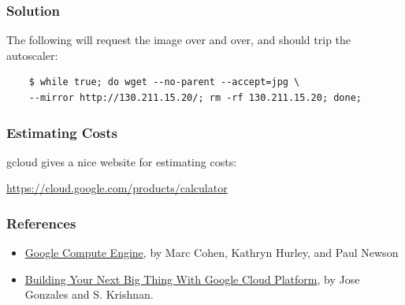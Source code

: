 \documentclass[9pt]{beamer}
\begin{document}
\begin{frame}[fragile]
  \frametitle{Solution}
  The following will request the image over and over, and should trip the autoscaler:
  \begin{verbatim}
    $ while true; do wget --no-parent --accept=jpg \
    --mirror http://130.211.15.20/; rm -rf 130.211.15.20; done;
  \end{verbatim}
\end{frame}

\begin{frame}[fragile]
\frametitle{Estimating Costs}
gcloud gives a nice website for estimating costs: 

\href{https://cloud.google.com/products/calculator}{https://cloud.google.com/products/calculator}
\end{frame}

\begin{frame}[fragile]
  \frametitle{References}
  \begin{itemize}
  \item \href{http://www.amazon.com/Google-Compute-Engine-Marc-Cohen/dp/1449360882/ref=sr_1_1?ie=UTF8&qid=1452552286&sr=8-1&keywords=Google+Compute+Engine}{Google Compute Engine}, by Marc Cohen, Kathryn Hurley, and Paul Newson
  \item \href{http://www.amazon.com/Building-Thing-Google-Cloud-Platform/dp/1484210050/ref=pd_sim_14_2?ie=UTF8&dpID=51NfTEhpFlL&dpSrc=sims&preST=_AC_UL160_SR11\%2C160_&refRID=1XA05PG1Q6D5NW63685Y}{Building Your Next Big Thing With Google Cloud Platform}, by Jose Gonzales and S. Krishnan.
  \end{itemize}
\end{frame}
\end{document}
